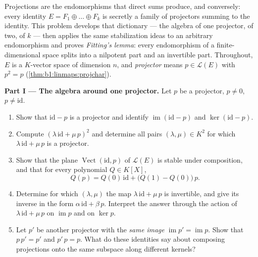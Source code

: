 \begin{problem}\label{pb:b1:linmaps:1}
Projections are the endomorphisms that direct sums produce, and
conversely: every identity $E = F_1 \oplus \dots \oplus F_k$ is
secretly a family of projectors summing to the identity. This
problem develops that dictionary --- the algebra of one
projector, of two, of $k$ --- then applies the same
stabilization ideas to an arbitrary endomorphism and proves
\emph{Fitting's lemma}: every endomorphism of a
finite-dimensional space splits into a nilpotent part and an
invertible part. Throughout, $E$ is a $K$-vector space of
dimension $n$, and \emph{projector} means $p \in \mathcal{L}(E)$
with $p^2 = p$ (\cref{thm:b1:linmaps:projchar}).

\medskip
\noindent\textbf{Part I --- The algebra around one projector.}
Let $p$ be a projector, $p \neq 0$, $p \neq \mathrm{id}$.
\begin{enumerate}
  \item Show that $\mathrm{id} - p$ is a projector and identify
        $\operatorname{im}(\mathrm{id} - p)$ and
        $\ker(\mathrm{id} - p)$.
  \item Compute $(\lambda\,\mathrm{id} + \mu\,p)^2$ and determine
        all pairs $(\lambda, \mu) \in K^2$ for which
        $\lambda\,\mathrm{id} + \mu\,p$ is a projector.
  \item Show that the plane $\operatorname{Vect}(\mathrm{id}, p)$
        of $\mathcal{L}(E)$ is stable under composition, and that
        for every polynomial $Q \in K[X]$,
        \[
        Q(p) = Q(0)\,\mathrm{id} + \bigl(Q(1) -
        Q(0)\bigr)\,p .
        \]
  \item Determine for which $(\lambda, \mu)$ the map
        $\lambda\,\mathrm{id} + \mu\,p$ is invertible, and give
        its inverse in the form $\alpha\,\mathrm{id} + \beta\,p$.
        Interpret the answer through the action of
        $\lambda\,\mathrm{id} + \mu\,p$ on $\operatorname{im} p$
        and on $\ker p$.
  \item Let $p'$ be another projector with the \emph{same image}
        $\operatorname{im} p' = \operatorname{im} p$. Show that
        $p\,p' = p'$ and $p'\,p = p$. What do these identities
        say about composing projections onto the same subspace
        along different kernels?
\end{enumerate}


\end{problem}
